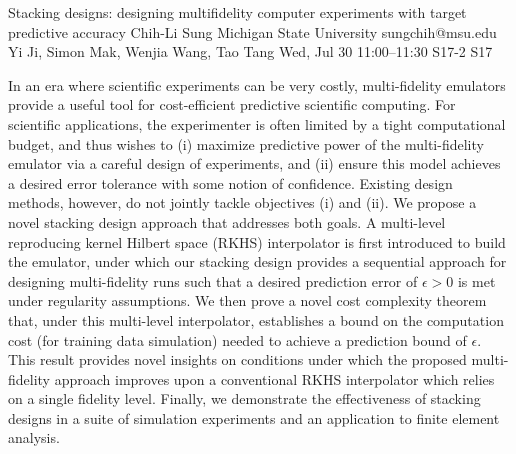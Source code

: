 \begin{talk}
  {Stacking designs: designing multifidelity computer experiments with target predictive accuracy}%
  {Chih-Li Sung}%
  {Michigan State University}%
  {sungchih@msu.edu}%
  {Yi Ji, Simon Mak, Wenjia Wang, Tao Tang}%
  {}%
  {Wed, Jul 30 11:00–11:30}%
  {S17-2}%
  {S17}%
  
				
			
In an era where scientific experiments can be very costly, multi-fidelity emulators provide a useful tool for cost-efficient predictive scientific computing. For scientific applications, the experimenter is often limited by a tight computational budget, and thus wishes to (i) maximize predictive power of the multi-fidelity emulator via a careful design of experiments, and (ii) ensure this model achieves a desired error tolerance with some notion of confidence. Existing design methods, however, do not jointly tackle objectives (i) and (ii). We propose a novel stacking design approach that addresses both goals. A  multi-level reproducing kernel Hilbert space (RKHS) interpolator is first introduced to build the emulator, under which our stacking design provides a sequential approach for designing multi-fidelity runs such that a desired prediction error of $\epsilon > 0$ is met under regularity assumptions. We then prove a novel cost complexity theorem that, under this multi-level interpolator, establishes a bound on the computation cost (for training data simulation) needed to achieve a prediction bound of $\epsilon$. This result provides novel insights on conditions under which the proposed multi-fidelity approach improves upon a conventional RKHS interpolator which relies on a single fidelity level. Finally, we demonstrate the effectiveness of stacking designs in a suite of simulation experiments and an application to finite element analysis.

\end{talk}

